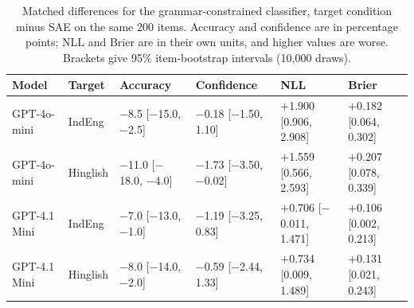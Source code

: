 \begin{table}[t]
\centering
\caption{Matched differences for the grammar-constrained classifier, target condition minus SAE on the same 200 items. Accuracy and confidence are in percentage points; NLL and Brier are in their own units, and higher values are worse. Brackets give 95\% item-bootstrap intervals (10,000 draws).}
\label{tab:calibration-contrasts}
\small
\setlength{\tabcolsep}{4pt}
\begin{tabular}{llllll}
\toprule
Model & Target & Accuracy & Confidence & NLL & Brier \\
\midrule
GPT-4o-mini & IndEng & $-$8.5 [$-$15.0, $-$2.5] & $-$0.18 [$-$1.50, 1.10] & +1.900 [0.906, 2.908] & +0.182 [0.064, 0.302] \\
GPT-4o-mini & Hinglish & $-$11.0 [$-$18.0, $-$4.0] & $-$1.73 [$-$3.50, $-$0.02] & +1.559 [0.566, 2.593] & +0.207 [0.078, 0.339] \\
\addlinespace
GPT-4.1 Mini & IndEng & $-$7.0 [$-$13.0, $-$1.0] & $-$1.19 [$-$3.25, 0.83] & +0.706 [$-$0.011, 1.471] & +0.106 [0.002, 0.213] \\
GPT-4.1 Mini & Hinglish & $-$8.0 [$-$14.0, $-$2.0] & $-$0.59 [$-$2.44, 1.33] & +0.734 [0.009, 1.489] & +0.131 [0.021, 0.243] \\
\bottomrule
\end{tabular}
\end{table}
